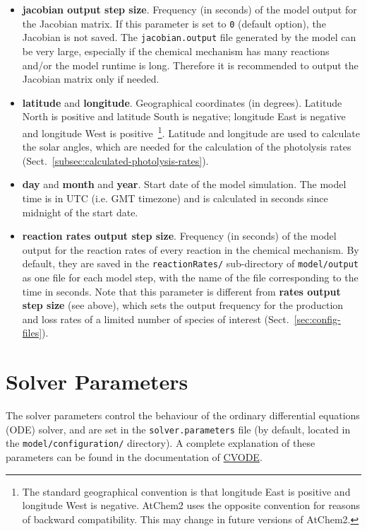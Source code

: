 \begin{itemize}
\item \textbf{jacobian output step size}. Frequency (in seconds) of
  the model output for the Jacobian matrix. If this parameter is set
  to \texttt{0} (default option), the Jacobian is not saved. The
  \texttt{jacobian.output} file generated by the model can be very
  large, especially if the chemical mechanism has many reactions
  and/or the model runtime is long. Therefore it is recommended to
  output the Jacobian matrix only if needed.
\item \textbf{latitude} and \textbf{longitude}. Geographical
  coordinates (in degrees). Latitude North is positive and latitude
  South is negative; longitude East is negative and longitude West is
  positive~\footnote{The standard geographical convention is that
    longitude East is positive and longitude West is negative. AtChem2
    uses the opposite convention for reasons of backward
    compatibility. This may change in future versions of
    AtChem2.}. Latitude and longitude are used to calculate the solar
  angles, which are needed for the calculation of the photolysis rates
  (Sect.~\ref{subsec:calculated-photolysis-rates}).
\item \textbf{day} and \textbf{month} and \textbf{year}. Start date of
  the model simulation. The model time is in UTC (i.e. GMT timezone)
  and is calculated in seconds since midnight of the start date.
\item \textbf{reaction rates output step size}. Frequency (in seconds)
  of the model output for the reaction rates of every reaction in the
  chemical mechanism. By default, they are saved in the
  \texttt{reactionRates/} sub-directory of \texttt{model/output} as
  one file for each model step, with the name of the file
  corresponding to the time in seconds. Note that this parameter is
  different from \textbf{rates output step size} (see above), which
  sets the output frequency for the production and loss rates of a
  limited number of species of interest (Sect.~\ref{sec:config-files}).
\end{itemize}

\section{Solver Parameters} \label{sec:solver-parameters}

The solver parameters control the behaviour of the ordinary
differential equations (ODE) solver, and are set in the
\texttt{solver.parameters} file (by default, located in the
\texttt{model/configuration/} directory). A complete explanation of
these parameters can be found in the documentation of
\href{https://computing.llnl.gov/projects/sundials/cvode}{CVODE}.

